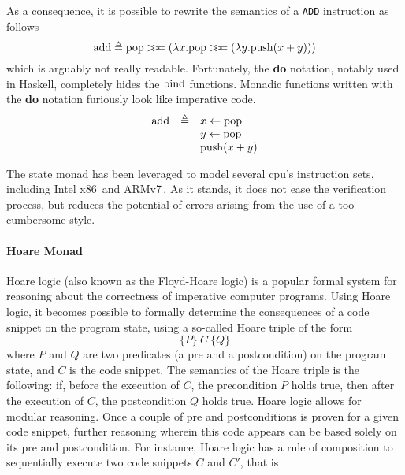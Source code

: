 As a consequence, it is possible to rewrite the semantics of a \texttt{ADD}
instruction as follows
%
\[
  \func{add} \triangleq \func{pop} \bind (\lambda x. \func{pop} \bind (\lambda
  y. \func{push}(x + y)))
\]
%
which is arguably not really readable.
%
Fortunately, the \textbf{do} notation, notably used in Haskell, completely hides
the $\func{bind}$ functions.
%
Monadic functions written with the \textbf{do} notation furiously look like
imperative code.
%
\[
  \begin{array}{rcl}
    \func{add} &\triangleq& x \leftarrow \func{pop} \\
               &          & y \leftarrow \func{pop} \\
               &          & \func{push}(x + y)
  \end{array}
\]

The state monad has been leveraged to model several \ac{cpu}'s instruction sets,
including Intel x86\,\cite{morrisett2012rocksalt} and
ARMv7\,\cite{fox2010armv7}.
%
As it stands, it does not ease the verification process, but reduces the
potential of errors arising from the use of a too cumbersome style.

\paragraph{Hoare Monad}
%
Hoare logic (also known as the Floyd-Hoare logic) is a popular formal system for
reasoning about the correctness of imperative computer programs.
%
Using Hoare logic, it becomes possible to formally determine the consequences of
a code snippet on the program state, using a so-called Hoare triple of the form
%
\[ \{P\}\ C\ \{Q\} \]
%
where $P$ and $Q$ are two predicates (a pre and a postcondition) on the program
state, and $C$ is the code snippet.
%
The semantics of the Hoare triple is the following: if, before the execution of
$C$, the precondition $P$ holds true, then after the execution of $C$, the
postcondition $Q$ holds true.
%
Hoare logic allows for modular reasoning.
%
Once a couple of pre and postconditions is proven for a given code snippet,
further reasoning wherein this code appears can be based solely on its pre and
postcondition.
%
For instance, Hoare logic has a rule of composition to sequentially execute two
code snippets $C$ and $C'$, that is

\begin{prooftree}
   
\end{prooftree}

